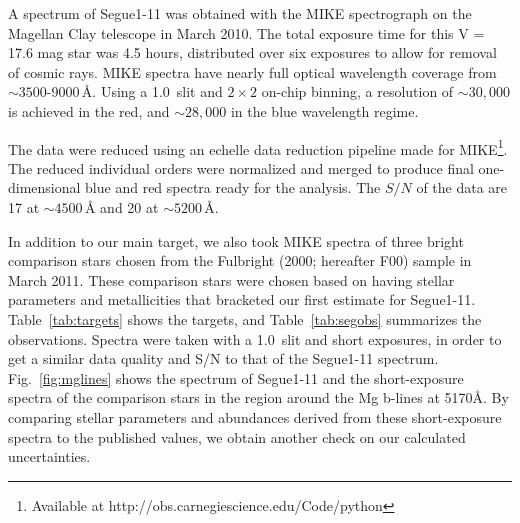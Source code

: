 \documentclass[manuscript]{aastex}
\begin{document}
A spectrum of Segue1-11 was obtained with the MIKE spectrograph \citep{mike}
on the Magellan Clay telescope in March 2010. The total exposure time for
this V = 17.6 mag star was 4.5 hours, distributed over six exposures to
 allow for removal of cosmic rays. MIKE spectra have
nearly full optical wavelength coverage from $\sim3500$-9000\,{\AA}. Using
a 1.0\arcsec\, slit and $2\times2$ on-chip binning, a resolution of
$\sim30,000$ is achieved in the red, and $\sim28,000$ in the blue
wavelength regime. 

The data were reduced using an echelle data reduction pipeline made for
MIKE\footnote{Available at http://obs.carnegiescience.edu/Code/python}.
The reduced individual orders were normalized and merged to produce
final one-dimensional blue and red spectra ready for the analysis. The
$S/N$ of the data are 17 at $\sim4500$\,{\AA} and 20 at $\sim5200$\,{\AA}.




In addition to our main target, we also took MIKE spectra of three bright comparison stars chosen from the Fulbright (2000; hereafter F00)\nocite{Fulbright2000} sample in March 2011. These comparison stars were chosen based on having stellar parameters and metallicities that bracketed our first estimate for Segue1-11. Table~\ref{tab:targets} shows the targets, and Table~\ref{tab:segobs} summarizes the observations.  Spectra were taken with a 1.0\arcsec\, slit and short exposures, in order to get a similar data quality and S/N to that of the Segue1-11 spectrum. Fig.~\ref{fig:mglines} shows the spectrum of Segue1-11 and the short-exposure spectra of the comparison stars in the region around the Mg b-lines at 5170\AA. By comparing stellar parameters and abundances derived from these short-exposure spectra to the published values, we obtain another check on our calculated uncertainties.
\end{document}
